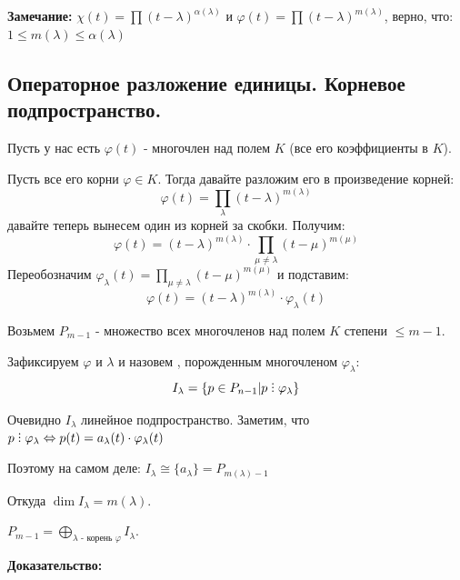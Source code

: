 \textbf{Замечание:}
$\chi(t) = \prod(t-\lambda)^{\alpha(\lambda)}$ и $\varphi(t) = \prod (t-\lambda)^{m(\lambda)}$, верно, что: $1 \leq m(\lambda)\leq \alpha(\lambda)$


\subsection{Операторное разложение единицы. Корневое подпространство.}

Пусть у нас есть $\varphi(t)$ - многочлен над полем $K$ (все его коэффициенты в $K$).

 Пусть все его корни $\varphi \in K$. Тогда давайте разложим его в произведение корней:
$$\varphi(t) = \prod\limits_{\lambda} (t-\lambda)^{m(\lambda)}$$
давайте теперь вынесем один из корней за скобки. Получим:
$$\varphi(t) = (t-\lambda)^{m(\lambda)} \cdot \prod\limits_{\mu\neq \lambda}(t-\mu)^{m(\mu)}$$
Переобозначим $\varphi_{\lambda}(t) = \prod\limits_{\mu\neq \lambda}(t-\mu)^{m(\mu)}$ и подставим:
$$\varphi(t) = (t-\lambda)^{m(\lambda)} \cdot \varphi_{\lambda}(t)$$

Возьмем $P_{m-1}$ - множество всех многочленов над полем $K$ степени $\leq m-1$.

Зафиксируем $\varphi$ и $\lambda$ и назовем  , порожденным многочленом $\varphi_\lambda$:
$$ I_{\lambda} = \{p \in P_{n-1}| p \divby \varphi _{\lambda }\}$$

Очевидно $I_{\lambda}$ линейное подпространство. Заметим, что $p \divby  \varphi_{\lambda} \Leftrightarrow p(t) = a_{\lambda}(t) \cdot \varphi_{\lambda}(t)$

 Поэтому на самом деле: $I_{\lambda} \cong \{a_{\lambda}\} = P_{m(\lambda)-1}$

 Откуда $\dim I_{\lambda} = m(\lambda)$.


 $P_{m-1} = \bigoplus\limits_{\lambda\text{ - корень $\varphi$}} I_{\lambda}$.

 \textbf{Доказательство:}

